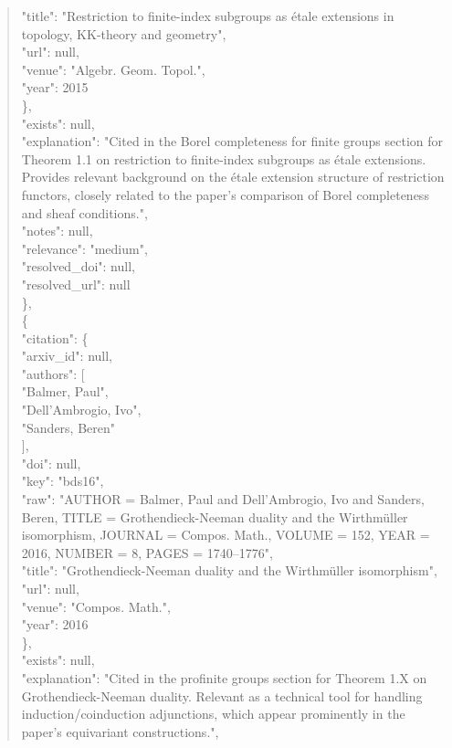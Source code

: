 \documentclass[11pt]{article}
\begin{document}
\begin{quote}
        "title": "Restriction to finite-index subgroups as étale extensions in topology, KK-theory and geometry",\\
        "url": null,\\
        "venue": "Algebr. Geom. Topol.",\\
        "year": 2015\\
      \},\\
      "exists": null,\\
      "explanation": "Cited in the Borel completeness for finite groups section for Theorem 1.1 on restriction to finite-index subgroups as étale extensions. Provides relevant background on the étale extension structure of restriction functors, closely related to the paper's comparison of Borel completeness and sheaf conditions.",\\
      "notes": null,\\
      "relevance": "medium",\\
      "resolved\_doi": null,\\
      "resolved\_url": null\\
    \},\\
    \{\\
      "citation": \{\\
        "arxiv\_id": null,\\
        "authors": [\\
          "Balmer, Paul",\\
          "Dell'Ambrogio, Ivo",\\
          "Sanders, Beren"\\
        ],\\
        "doi": null,\\
        "key": "bds16",\\
        "raw": "AUTHOR = Balmer, Paul and Dell'Ambrogio, Ivo and Sanders, Beren, TITLE = Grothendieck-Neeman duality and the Wirthmüller isomorphism, JOURNAL = Compos. Math., VOLUME = 152, YEAR = 2016, NUMBER = 8, PAGES = 1740--1776",\\
        "title": "Grothendieck-Neeman duality and the Wirthmüller isomorphism",\\
        "url": null,\\
        "venue": "Compos. Math.",\\
        "year": 2016\\
      \},\\
      "exists": null,\\
      "explanation": "Cited in the profinite groups section for Theorem 1.X on Grothendieck-Neeman duality. Relevant as a technical tool for handling induction/coinduction adjunctions, which appear prominently in the paper's equivariant constructions.",\\

\end{quote}
\end{document}
